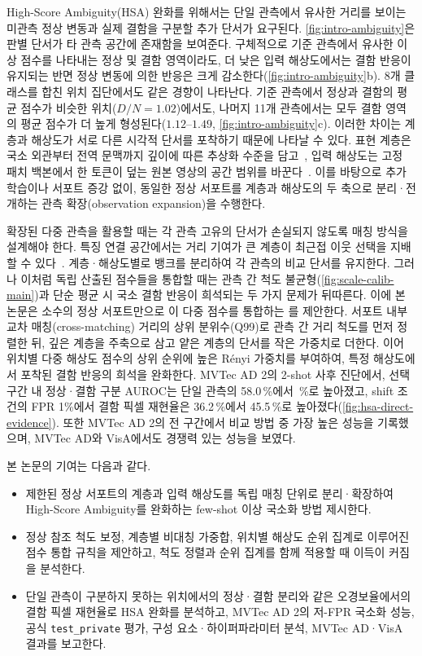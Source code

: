 High-Score Ambiguity(HSA) 완화를 위해서는 단일 관측에서 유사한 거리를 보이는 미관측 정상 변동과 실제 결함을 구분할 추가 단서가 요구된다.
\cref{fig:intro-ambiguity}은 판별 단서가 타 관측 공간에 존재함을 보여준다.
구체적으로 기준 관측에서 유사한 이상 점수를 나타내는 정상 및 결함 영역이라도, 더 낮은 입력 해상도에서는 결함 반응이 유지되는 반면 정상 변동에 의한 반응은 크게 감소한다(\cref{fig:intro-ambiguity}b).
8개 클래스를 합친 위치 집단에서도 같은 경향이 나타난다. 기준 관측에서 정상과 결함의 평균 점수가 비슷한 위치($D/N = 1.02$)에서도, 나머지 11개 관측에서는 모두 결함 영역의 평균 점수가 더 높게 형성된다($1.12$--$1.49$, \cref{fig:intro-ambiguity}c).
이러한 차이는 계층과 해상도가 서로 다른 시각적 단서를 포착하기 때문에 나타날 수 있다.
표현 계층은 국소 외관부터 전역 문맥까지 깊이에 따른 추상화 수준을 담고~\cite{raghu2021vision,ranftl2021vision}, 입력 해상도는 고정 패치 백본에서 한 토큰이 덮는 원본 영상의 공간 범위를 바꾼다~\cite{shi2024scaling,fu2024featup}.
이를 바탕으로 추가 학습이나 서포트 증강 없이, 동일한 정상 서포트를 계층과 해상도의 두 축으로 분리·전개하는 관측 확장(observation expansion)을 수행한다.

확장된 다중 관측을 활용할 때는 각 관측 고유의 단서가 손실되지 않도록 매칭 방식을 설계해야 한다.
특징 연결 공간에서는 거리 기여가 큰 계층이 최근접 이웃 선택을 지배할 수 있다~\cite{patchcore}.  계층·해상도별로 뱅크를 분리하여 각 관측의 비교 단서를 유지한다.
그러나 이처럼 독립 산출된 점수들을 통합할 때는 관측 간 척도 불균형(\cref{fig:scale-calib-main})과 단순 평균 시 국소 결함 반응이 희석되는 두 가지 문제가 뒤따른다.
이에 본 논문은 소수의 정상 서포트만으로 이 다중 점수를 통합하는 \textbf{\method}를 제안한다.
 서포트 내부 교차 매칭(cross-matching) 거리의 상위 분위수(Q99)로 관측 간 거리 척도를 먼저 정렬한 뒤, 깊은 계층을 주축으로 삼고 얕은 계층의 단서를 작은 가중치로 더한다.
이어 위치별 다중 해상도 점수의 상위 순위에 높은 Rényi 가중치를 부여하여, 특정 해상도에서 포착된 결함 반응의 희석을 완화한다.
MVTec AD 2의 2-shot 사후 진단에서, 선택 구간 내 정상·결함 구분 AUROC는 단일 관측의 58.0\,\%에서 \,\%로 높아졌고, shift 조건의 FPR 1\%에서 결함 픽셀 재현율은 36.2\,\%에서 45.5\,\%로 높아졌다(\cref{fig:hsa-direct-evidence}).
또한 MVTec AD 2의  전 구간에서 비교 방법 중 가장 높은 성능을 기록했으며, MVTec AD와 VisA에서도 경쟁력 있는 성능을 보였다.

본 논문의 기여는 다음과 같다.
\begin{itemize}
  \item 제한된 정상 서포트의 계층과 입력 해상도를 독립 매칭 단위로 분리·확장하여 High-Score Ambiguity를 완화하는 few-shot 이상 국소화 방법  제시한다.
  \item 정상 참조 척도 보정, 계층별 비대칭 가중합, 위치별 해상도 순위 집계로 이루어진 점수 통합 규칙을 제안하고, 척도 정렬과 순위 집계를 함께 적용할 때 이득이 커짐을 분석한다.
  \item 단일 관측이 구분하지 못하는 위치에서의 정상·결함 분리와 같은 오경보율에서의 결함 픽셀 재현율로 HSA 완화를 분석하고, MVTec AD 2의 저-FPR 국소화 성능, 공식 \texttt{test\_private} 평가, 구성 요소·하이퍼파라미터 분석, MVTec AD·VisA 결과를 보고한다.
\end{itemize}
